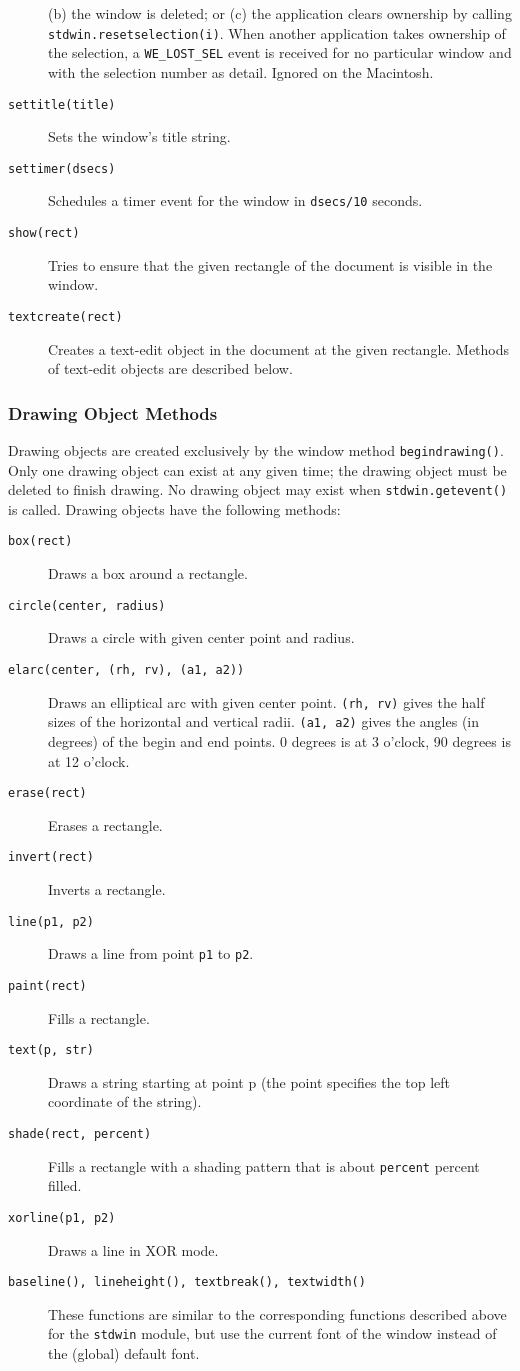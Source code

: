 \begin{description}
(b) the window is deleted; or
(c) the application clears ownership by calling
{\tt stdwin.resetselection(i)}.
When another application takes ownership of the selection, a
{\tt WE\_LOST\_SEL}
event is received for no particular window and with the selection number
as detail.
Ignored on the Macintosh.
\item[{\tt settitle(title)}]
Sets the window's title string.
\item[{\tt settimer(dsecs)}]
Schedules a timer event for the window in
{\tt dsecs/10}
seconds.
\item[{\tt show(rect)}]
Tries to ensure that the given rectangle of the document is visible in
the window.
\item[{\tt textcreate(rect)}]
Creates a text-edit object in the document at the given rectangle.
Methods of text-edit objects are described below.
\end{description}

\subsubsection{Drawing Object Methods}

Drawing objects are created exclusively by the window method
{\tt begindrawing()}.
Only one drawing object can exist at any given time; the drawing object
must be deleted to finish drawing.
No drawing object may exist when
{\tt stdwin.getevent()}
is called.
Drawing objects have the following methods:
\begin{description}
\item[{\tt box(rect)}]
Draws a box around a rectangle.
\item[{\tt circle(center, radius)}]
Draws a circle with given center point and radius.
\item[{\tt elarc(center, (rh, rv), (a1, a2))}]
Draws an elliptical arc with given center point.
{\tt (rh, rv)}
gives the half sizes of the horizontal and vertical radii.
{\tt (a1, a2)}
gives the angles (in degrees) of the begin and end points.
0 degrees is at 3 o'clock, 90 degrees is at 12 o'clock.
\item[{\tt erase(rect)}]
Erases a rectangle.
\item[{\tt invert(rect)}]
Inverts a rectangle.
\item[{\tt line(p1, p2)}]
Draws a line from point
{\tt p1}
to
{\tt p2}.
\item[{\tt paint(rect)}]
Fills a rectangle.
\item[{\tt text(p, str)}]
Draws a string starting at point p (the point specifies the
top left coordinate of the string).
\item[{\tt shade(rect, percent)}]
Fills a rectangle with a shading pattern that is about
{\tt percent}
percent filled.
\item[{\tt xorline(p1, p2)}]
Draws a line in XOR mode.
\item[{\tt baseline(), lineheight(), textbreak(), textwidth()}]
These functions are similar to the corresponding functions described
above for the
{\tt stdwin}
module, but use the current font of the window instead of the (global)
default font.
\end{description}

